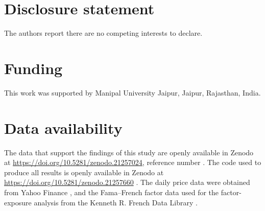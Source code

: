 \documentclass[]{interact}
\begin{document}
\section*{Disclosure statement}
The authors report there are no competing interests to declare.

\section*{Funding}
This work was supported by Manipal University Jaipur, Jaipur, Rajasthan, India.


\section*{Data availability}
The data that support the findings of this study are openly available in Zenodo at \url{https://doi.org/10.5281/zenodo.21257024}, reference number \citep{hemrajani2026data}. The code used to produce all results is openly available in Zenodo at \url{https://doi.org/10.5281/zenodo.21257660} \citep{kumar2026code}. The daily price data were obtained from Yahoo Finance \citep{yahoo2025data}, and the Fama--French factor data used for the factor-exposure analysis from the Kenneth R. French Data Library \citep{french2025data}.
\end{document}
